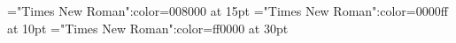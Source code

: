\documentclass{article}
\begin{document}
 
\font\tctbta="Times New Roman":color=008000 at 15pt
\font\tbta="Times New Roman":color=0000ff at 10pt
\font\ta="Times New Roman":color=ff0000 at 30pt





\end{document}
